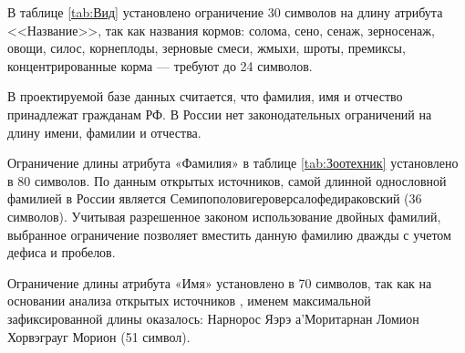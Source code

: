 В таблице \ref{tab:Вид} установлено ограничение 30 символов на длину атрибута <<Название>>, так как названия кормов: солома, сено, сенаж, зерносенаж, овощи, силос, корнеплоды, зерновые смеси, жмыхи, шроты, премиксы, концентрированные корма --- требуют до 24 символов.

\begin{table}[H]
\centering
\caption{Зоотехник (Livestock\_specialist)}
\label{tab:Зоотехник}
\end{table}

В проектируемой базе данных считается, что фамилия, имя и отчество принадлежат гражданам РФ. В России нет законодательных ограничений на длину имени, фамилии и отчества. 

Ограничение длины атрибута «Фамилия» в таблице \ref{tab:Зоотехник} установлено в 80 символов. По данным открытых источников, самой длинной однословной фамилией в России является Семипополовигероверсалофедираковский (36 символов). Учитывая разрешенное законом использование двойных фамилий, выбранное ограничение позволяет вместить данную фамилию дважды с учетом дефиса и пробелов. 

Ограничение длины атрибута «Имя» установлено в 70 символов, так как на основании анализа открытых источников \cite{sciencemail2025}, \cite{genoru2013} именем максимальной зафиксированной длины оказалось: Нарнорос Яэрэ а'Моритарнан Ломион Хорвэграуг Морион (51 символ). 


